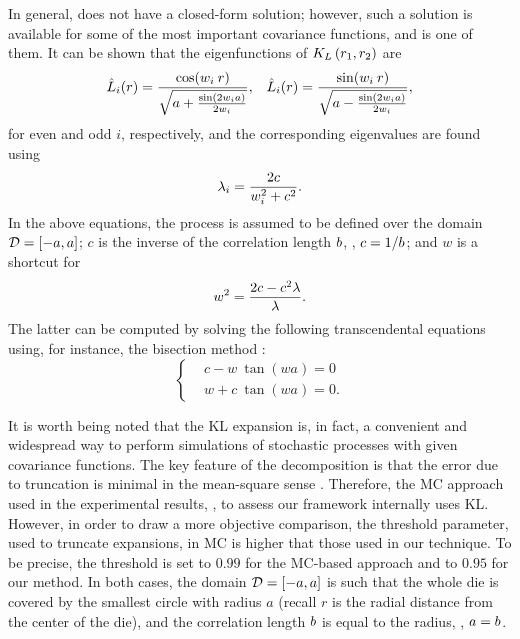 In general,  does not have a closed-form solution; however, such a solution is available for some of the most important covariance functions, and  is one of them. It can be shown \cite{ghanem1991} that the eigenfunctions of $K_{L}\left(r_1, r_2\right)$ are
\begin{align*}
  & \hat{L}_i(r) = \frac{\cos(w_i \: r)}{\sqrt{a + \frac{\sin(2 w_i a)}{2 w_i}}}, & \hat{L}_i(r) = \frac{\sin(w_i \: r)}{\sqrt{a - \frac{\sin(2 w_i a)}{2 w_i}}},
\end{align*}
for even and odd $i$, respectively, and the corresponding eigenvalues are found using
\[
  \lambda_i = \frac{2 c}{w_i^2 + c^2}.
\]
In the above equations, the process is assumed to be defined over the domain $\mathcal{D} = [-a, a]$; $c$ is the inverse of the correlation length $b$, \ie, $c = 1 / b$; and $w$ is a shortcut for
\[
  w^2 = \frac{2 c - c^2 \lambda}{\lambda}.
\]
The latter can be computed by solving the following transcendental equations using, for instance, the bisection method \cite{press2007}:
\begin{equation*}
  \begin{cases}
    & c - w \: \tan (w a) = 0 \\
    & w + c \: \tan (w a) = 0.
  \end{cases}
\end{equation*}

It is worth being noted that the KL expansion is, in fact, a convenient and widespread way to perform simulations of stochastic processes with given covariance functions. The key feature of the decomposition is that the error due to truncation is minimal in the mean-square sense \cite{ghanem1991}. Therefore, the MC approach used in the experimental results, , to assess our framework internally uses KL. However, in order to draw a more objective comparison, the threshold parameter, used to truncate expansions, in MC is higher that those used in our technique. To be precise, the threshold is set to $0.99$ for the MC-based approach and to $0.95$ for our method. In both cases, the domain $\mathcal{D} = [-a, a]$ is such that the whole die is covered by the smallest circle with radius $a$ (recall $r$ is the radial distance from the center of the die), and the correlation length $b$ is equal to the radius, \ie, $a = b$.
